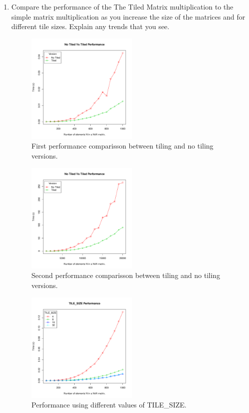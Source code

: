 \documentclass[a4paper,10pt]{scrartcl}
\begin{document}
\begin{enumerate}
 \item Compare the performance of the The Tiled Matrix multiplication to the simple matrix multiplication as you increase the size of the matrices and for different tile sizes. Explain any trends that you see. 

 \begin{figure}
 \centering
 \includegraphics[width=0.5\textwidth]{./NTVsT_50-1K}
 \caption{First performance comparisson between tiling and no tiling versions.}\label{fig:NTVsT_50-1K}
 \end{figure}

 \begin{figure}
 \centering
 \includegraphics[width=0.5\textwidth]{./NTVsT_1K-20K}
 \caption{Second performance comparisson between tiling and no tiling versions.}\label{fig:NTVsT_50-1K}
 \end{figure}

 
 
 \begin{figure}
 \centering
 \includegraphics[width=0.5\textwidth]{./TilesizePerformance_50-1K}
 \caption{Performance using different values of TILE\_SIZE.}\label{fig:NTVsT_50-1K}
 \end{figure}


\end{enumerate}
\end{document}
